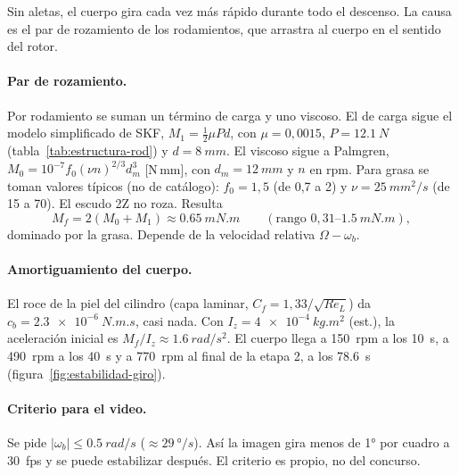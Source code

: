 Sin aletas, el cuerpo gira cada vez más rápido durante todo el descenso. La causa es el
par de rozamiento de los rodamientos, que arrastra al cuerpo en el sentido del rotor.

\paragraph{Par de rozamiento.} Por rodamiento se suman un término de carga y uno viscoso.
El de carga sigue el modelo simplificado de SKF, $M_1=\tfrac12\mu Pd$, con
$\mu=0{,}0015$, $P=\SI{12.1}{N}$ (tabla~\ref{tab:estructura-rod}) y $d=\SI{8}{mm}$. El
viscoso sigue a Palmgren, $M_0=10^{-7}f_0(\nu n)^{2/3}d_m^3$ [N\,mm], con
$d_m=\SI{12}{mm}$ y $n$ en rpm. Para grasa se toman valores típicos (no de catálogo):
$f_0=1{,}5$ (de 0,7 a 2) y $\nu=\SI{25}{mm^2/s}$ (de 15 a 70). El escudo 2Z no roza.
Resulta
\begin{equation}
  M_f=2(M_0+M_1)\approx\SI{0.65}{mN.m}\qquad(\text{rango }0{,}31\text{--}\SI{1.5}{mN.m}),
\end{equation}
dominado por la grasa. Depende de la velocidad relativa $\Omega-\omega_b$.

\paragraph{Amortiguamiento del cuerpo.} El roce de la piel del cilindro (capa laminar,
$C_f=1{,}33/\sqrt{Re_L}$) da $c_b=\SI{2.3e-6}{N.m.s}$, casi nada. Con
$I_z=\SI{4e-4}{kg.m^2}$ (est.), la aceleración inicial es $M_f/I_z\approx\SI{1.6}{rad/s^2}$.
El cuerpo llega a \num{150}~rpm a los \SI{10}{s}, a \num{490}~rpm a los \SI{40}{s} y a
\num{770}~rpm al final de la etapa 2, a los \SI{78.6}{s} (figura~\ref{fig:estabilidad-giro}).

\paragraph{Criterio para el video.} Se pide $|\omega_b|\le\SI{0.5}{rad/s}$
($\approx\SI{29}{\degree/s}$). Así la imagen gira menos de \ang{1} por cuadro a
\SI{30}{fps} y se puede estabilizar después. El criterio es propio, no del concurso.

